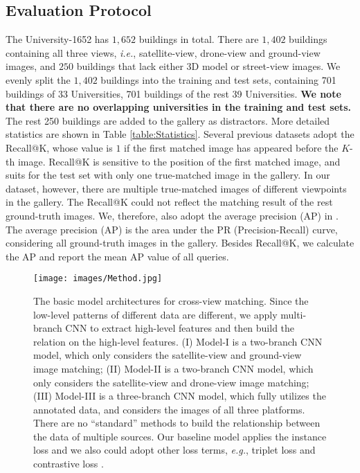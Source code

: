 \documentclass[sigconf]{acmart}
\def\eg{\emph{e.g.}}
\def\ie{\emph{i.e.}}
\begin{document}
\subsection{Evaluation Protocol}
The University-1652 has $1,652$ buildings in total. There are $1,402$ buildings containing all three views, \ie, satellite-view, drone-view and ground-view images, and $250$ buildings that lack either 3D model or street-view images. We evenly split the $1,402$ buildings into the training and test sets, containing 701 buildings of 33 Universities, 701 buildings of the rest 39 Universities. \textbf{We note that there are no overlapping universities in the training and test sets.} The rest 250 buildings are added to the gallery as distractors. More detailed statistics are shown in Table \ref{table:Statistics}. Several previous datasets \cite{liu2019lending,zhai2017predicting,vo2016localizing} adopt the Recall@K, whose value is $1$ if the first matched image has appeared before the $K$-th image. Recall@K is sensitive to the position of the first matched image, and suits for the test set with only one true-matched image in the gallery. In our dataset, however, there are multiple true-matched images of different viewpoints in the gallery. The Recall@K could not reflect the matching result of the rest ground-truth images. We, therefore, also adopt the average precision (AP) in \cite{lin2015learning,tian2017cross}. The average precision (AP) is the area under the PR (Precision-Recall) curve, considering all ground-truth images in the gallery. Besides Recall@K, we calculate the AP and report the mean AP value of all queries. 

\begin{figure}[t]
\begin{center}
     \texttt{[image: images/Method.jpg]}
\end{center}
\vspace{-.2in}
      \caption{ The basic model architectures for cross-view matching. Since the low-level patterns of different data are different, we apply multi-branch CNN to extract high-level features and then build the relation on the high-level features. (I) Model-I is a two-branch CNN model, which only considers the satellite-view and ground-view image matching; (II) Model-II is a two-branch CNN model, which only considers the satellite-view and drone-view image matching; (III) Model-III is a three-branch CNN model, which fully utilizes the annotated data, and considers the images of all three platforms. There are no ``standard'' methods to build the relationship between the data of multiple sources. Our baseline model applies the instance loss \cite{zheng2017dual} and we also could adopt other loss terms, \eg, triplet loss \cite{chechik2010large,deng2018triplet} and contrastive loss \cite{lin2015learning,workman2015wide,zheng2016discriminatively}.
      }\label{fig:method}
\end{figure}
\end{document}
